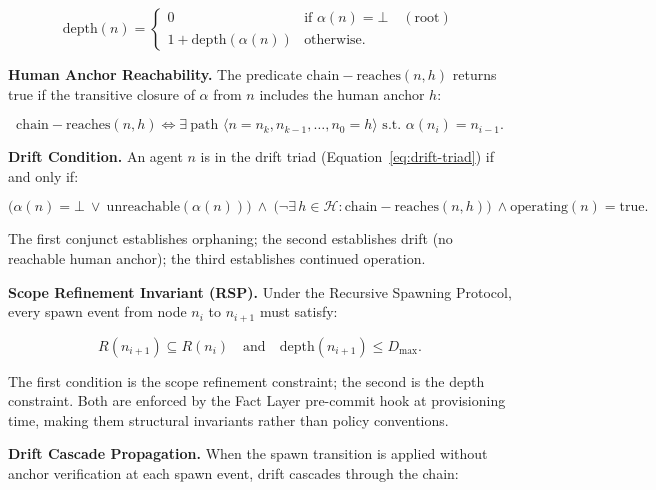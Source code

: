 \begin{equation}
\mathrm{depth}(n) =
\begin{cases}
0 & \text{if } \alpha(n) = \bot \quad (\text{root}) \\
1 + \mathrm{depth}(\alpha(n)) & \text{otherwise}.
\end{cases}
\label{eq:depth}
\end{equation}

\medskip
\noindent\textbf{Human Anchor Reachability.}
The predicate $\mathrm{chain-reaches}(n, h)$ returns true if the transitive closure of $\alpha$ from $n$ includes the human anchor $h$:

\begin{equation}
\mathrm{chain-reaches}(n, h) \iff \exists\ \text{path } \langle n = n_k, n_{k-1}, \ldots, n_0 = h \rangle \text{ s.t. } \alpha(n_i) = n_{i-1}.
\label{eq:chain-reaches}
\end{equation}

\medskip
\noindent\textbf{Drift Condition.}
An agent $n$ is in the drift triad (Equation~\ref{eq:drift-triad}) if and only if:

\begin{equation}
\bigl( \alpha(n) = \bot \ \lor \ \mathrm{unreachable}(\alpha(n)) \bigr)\ \land\ \bigl( \neg\exists\, h \in \mathcal{H} : \mathrm{chain-reaches}(n, h) \bigr)\ \land \mathrm{operating}(n) = \mathrm{true}.
\label{eq:drift-condition}
\end{equation}

The first conjunct establishes orphaning; the second establishes drift (no reachable human anchor); the third establishes continued operation.

\medskip
\noindent\textbf{Scope Refinement Invariant (RSP).}
Under the Recursive Spawning Protocol, every spawn event from node $n_i$ to $n_{i+1}$ must satisfy:

\begin{equation}
R(n_{i+1}) \subseteq R(n_i) \quad \text{and} \quad \mathrm{depth}(n_{i+1}) \leq D_{\max}.
\label{eq:scope-refinement}
\end{equation}

The first condition is the scope refinement constraint; the second is the depth constraint. Both are enforced by the Fact Layer pre-commit hook at provisioning time, making them structural invariants rather than policy conventions.

\medskip
\noindent\textbf{Drift Cascade Propagation.}
When the spawn transition is applied without anchor verification at each spawn event, drift cascades through the chain:

